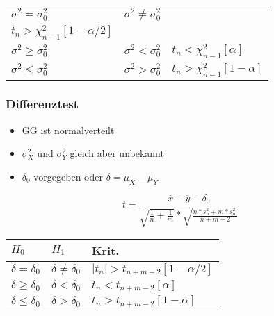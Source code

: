 \documentclass[a4paper]{article}
\begin{document}
\begin{landscape}
\begin{multicols}{4}
\begin{center}
\begin{tabular}{|l|l|l|}
            $ \sigma^2 = \sigma^2_0$      & $ \sigma^2 \neq \sigma^2_0$ &\makecell{$t_n < \chi^2_{n-1}[\alpha/2]$\\$t_n > \chi^2_{n-1}[1-\alpha/2]$}\\ \hline
             $ \sigma^2  \geq \sigma^2_0$    & $\sigma^2 < \sigma^2_0$  &  $t_n < \chi^2_{n-1}[\alpha]$     \\ \hline
             $\sigma^2  \leq \sigma^2_0$     &  $\sigma^2 > \sigma^2_0$&   $t_n > \chi^2_{n-1}[1-\alpha]$   \\ \hline
            \end{tabular}
    \end{center}

        \subsubsection*{Differenztest}
        \begin{itemize}[noitemsep,nolistsep,leftmargin=*]
            \item GG ist normalverteilt
            \item $\sigma^2_X$ und $\sigma^2_Y$ gleich aber unbekannt
            \item $\delta_0$ vorgegeben oder $\delta = \mu_X - \mu_Y$
        \end{itemize}
             $$t = \frac{\overline{x}-\overline{y}-\delta_0}{\sqrt{\frac{1}{n}+\frac{1}{m}}* \sqrt{\frac{n*s^2_n + m*s^2_m}{n+m-2}}}$$
        \begin{center}
                \begin{tabular}{|l|l|l|}
                \hline
                $H_0$ & $H_1$ & Krit. \\ \hline
                $\delta=\delta_0$      & $ \delta \neq \delta_0$ &   $|t_n| > t_{n+m-2}[1-\alpha/2]$    \\ \hline
                 $\delta \geq\delta_0$     & $\delta < \delta_0$  &  $t_n < t_{n+m-2}[\alpha]$     \\ \hline
                 $\delta \leq\delta_0$     &  $\delta > \delta_0$&   $t_n > t_{n+m-2}[1-\alpha]$    \\ \hline
                \end{tabular}
        \end{center}
        

\end{multicols}
\end{landscape}
\end{document}
